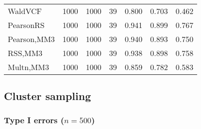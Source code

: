 \documentclass[
]{article}
\begin{document}
\begin{table}[H]
{\begin{tabular}[t]{lrrrrrr}
\hspace{1em}WaldVCF & 1000 & 1000 & 39 & 0.800 & 0.703 & 0.462\\
\hspace{1em}PearsonRS & 1000 & 1000 & 39 & 0.941 & 0.899 & 0.767\\
\hspace{1em}Pearson,MM3 & 1000 & 1000 & 39 & 0.940 & 0.893 & 0.750\\
\hspace{1em}RSS,MM3 & 1000 & 1000 & 39 & 0.938 & 0.898 & 0.758\\
\hspace{1em}Multn,MM3 & 1000 & 1000 & 39 & 0.859 & 0.782 & 0.583\\
\bottomrule
\end{tabular}}
\endgroup{}
\end{table}

\hypertarget{cluster-sampling}{%
\subsection{Cluster sampling}\label{cluster-sampling}}

\hypertarget{type-i-errors-n500-2}{%
\subsubsection{\texorpdfstring{Type I errors
(\(n=500\))}{Type I errors (n=500)}}\label{type-i-errors-n500-2}}
\end{document}
